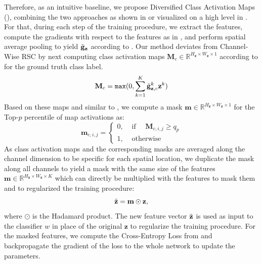 Therefore, as an intuitive baseline, we propose Diversified Class Activation Maps (\divcam), combining the two approaches as shown in  or visualized on a high level in . For that, during each step of the training procedure, we extract the features, compute the gradients with respect to the features as in , and perform spatial average pooling to yield $\Tilde{\mathbf{g}}_\mathbf{z}$ according to . Our method deviates from Channel-Wise RSC by next computing class activation maps $\mathbf{M}_c \in \mathbb{R}^{H_\mathbf{z} \times W_\mathbf{z} \times 1}$ according to  for the ground truth class label.
\begin{equation}
\label{eq:Map}
    \mathbf{M}_c = \mathtt{max}(0,\sum_{k=1}^K\Tilde{\mathbf{g}}_{\mathbf{z},c}^k \mathbf{z}^k)
\end{equation}
Based on these maps and similar to , we compute a mask $\mathbf{m} \in \mathbb{R}^{H_\mathbf{z} \times W_\mathbf{z} \times 1}$ for the Top-$p$ percentile of map activations as: 
\begin{equation}
\mathbf{m}_{c,i,j}=\left\{\begin{array}{ll}
0, & \text { if } \quad \mathbf{M}_{c, i,j} \geq q_{p} \\
1, & \text { otherwise }
\end{array}\right.
\label{eq:MaskMap}
\end{equation}
As class activation maps and the corresponding masks are averaged along the channel dimension to be specific for each spatial location, we duplicate the mask along all channels to yield a mask with the same size of the features $\mathbf{m} \in \mathbb{R}^{H_\mathbf{z} \times W_\mathbf{z} \times K}$ which can directly be multiplied with the features to mask them and to regularized the training procedure:
\begin{equation}
\label{eq:mutate}
\Tilde{\mathbf{z}} = \mathbf{m} \odot \mathbf{z},
\end{equation}
where $\odot$ is the Hadamard product. The new feature vector $\Tilde{\mathbf{z}}$ is used as input to the classifier $w$ in place of the original $\mathbf{z}$ to regularize the training procedure. For the masked features, we compute the Cross-Entropy Loss from  and backpropagate the gradient of the loss to the whole network to update the parameters.

